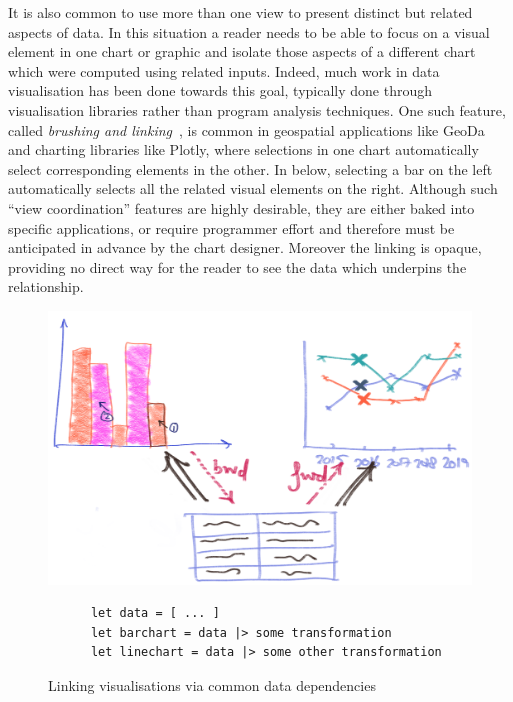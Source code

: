 It is also common to use more than one view to present distinct but related aspects of data. In this situation a reader needs to be able to focus on a visual element in one chart or graphic and isolate those aspects of a different chart which were computed using related inputs. Indeed, much work in data visualisation has been done towards this goal, typically done through visualisation libraries rather than program analysis techniques. One such feature, called \emph{brushing and linking}~\cite{becker87}, is common in geospatial applications like GeoDa~\cite{anselin06} and charting libraries like Plotly, where selections in one chart automatically select corresponding elements in the other. In  below, selecting a bar on the left automatically selects all the related visual elements on the right. Although such ``view coordination'' features are highly desirable, they are either baked into specific applications, or require programmer effort and therefore must be anticipated in advance by the chart designer. Moreover the linking is opaque, providing no direct way for the reader to see the data which underpins the relationship.

\begin{figure}[H]
   {\includegraphics[scale=0.14]{fig/example/vis-linking.png}}
   \small
   \begin{lstlisting}
      let data = [ ... ]
      let barchart = data |> some transformation
      let linechart = data |> some other transformation
   \end{lstlisting}
   \caption{Linking visualisations via common data dependencies}
   \label{fig:introduction:vis-linking}
\end{figure}

